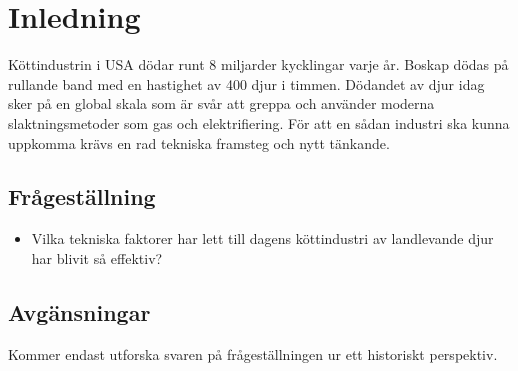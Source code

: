 \section{Inledning}
Köttindustrin i USA dödar runt 8 miljarder kycklingar varje år. Boskap dödas på rullande band med en hastighet av 400 djur i timmen. Dödandet av djur idag sker på en global skala som är svår att greppa och använder moderna slaktningsmetoder som gas och elektrifiering. \citep{edgerton}
\newline
\newline
För att en sådan industri ska kunna uppkomma krävs en rad tekniska framsteg och nytt tänkande.   

\subsection{Frågeställning}
\begin{itemize}
	\item Vilka tekniska faktorer har lett till dagens köttindustri av landlevande djur har blivit så effektiv?
\end{itemize}

\subsection{Avgänsningar}
Kommer endast utforska svaren på frågeställningen ur ett historiskt perspektiv. 